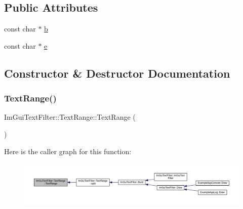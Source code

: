 \subsection*{Public Attributes}
\begin{DoxyCompactItemize}
\item 
const char $\ast$ \mbox{\hyperlink{struct_im_gui_text_filter_1_1_text_range_a705cf9c8fb0796b3bab9cf20cb18b0ca}{b}}
\item 
const char $\ast$ \mbox{\hyperlink{struct_im_gui_text_filter_1_1_text_range_a20daef0e47167d49a017d8f54cb7c607}{e}}
\end{DoxyCompactItemize}


\subsection{Constructor \& Destructor Documentation}
\mbox{\label{struct_im_gui_text_filter_1_1_text_range_a5a6548fd40884ef5837e6a1ffa33af61}} 
\subsubsection{\texorpdfstring{Text\+Range()}{TextRange()}\hspace{0.1cm}{\footnotesize\ttfamily [1/2]}}
{\footnotesize\ttfamily Im\+Gui\+Text\+Filter\+::\+Text\+Range\+::\+Text\+Range (\begin{DoxyParamCaption}{ }\end{DoxyParamCaption})\hspace{0.3cm}{\ttfamily [inline]}}

Here is the caller graph for this function\+:
\nopagebreak
\begin{figure}[H]
\begin{center}
\leavevmode
\includegraphics[width=350pt]{struct_im_gui_text_filter_1_1_text_range_a5a6548fd40884ef5837e6a1ffa33af61_icgraph}
\end{center}
\end{figure}
\mbox{\label{struct_im_gui_text_filter_1_1_text_range_a4a2b377d4fd141fc3664378041f9f007}} 
